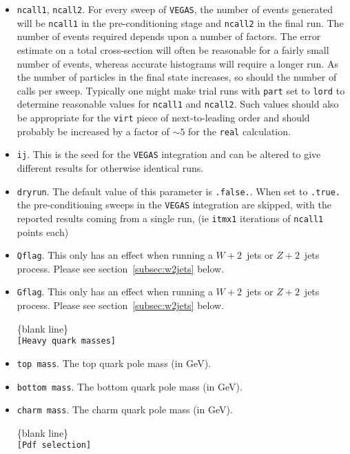 \documentclass[12pt]{article}
\begin{document}
\begin{itemize}
\item {\tt ncall1}, {\tt ncall2}. For every sweep of {\tt VEGAS},
the number of events generated will be {\tt ncall1} in the
pre-conditioning stage and {\tt ncall2} in the final run. The number
of events required depends upon a number of factors. The error
estimate on a total cross-section will often be reasonable for a
fairly small number of events, whereas accurate histograms will
require a longer run. As the number of particles in the final state
increases, so should the number of calls per sweep. Typically one
might make trial runs with {\tt part} set to {\tt lord} to determine
reasonable values for {\tt ncall1} and {\tt ncall2}. Such values
should also be appropriate for the {\tt virt} piece of
next-to-leading order and should probably be increased by a factor of
$\sim 5$ for the {\tt real} calculation.

\item {\tt ij}. This is the seed for the {\tt VEGAS} integration
and can be altered to give different results for otherwise identical
runs.

\item {\tt dryrun}. The default value of this parameter is
{\tt .false.}. When set to {\tt .true.} the pre-conditioning sweeps
in the {\tt VEGAS} integration are skipped, with the reported
results coming from a single run, (ie {\tt itmx1} iterations of 
{\tt ncall1} points each)
\item {\tt Qflag}. This only has an effect when running a
$W+2$~jets or $Z+2$~jets process. Please see section~\ref{subsec:w2jets}
below.

\item {\tt Gflag}. This only has an effect when running a
$W+2$~jets or $Z+2$~jets process. Please see section~\ref{subsec:w2jets}
below.

\begin{center}
\{blank line\} \\
{\tt [Heavy quark masses] }
\end{center}
\item {\tt top mass}. The top quark pole mass (in GeV).
\item {\tt bottom mass}. The bottom quark pole mass (in GeV).
\item {\tt charm mass}. The charm quark pole mass (in GeV).

\begin{center}
\{blank line\} \\
{\tt [Pdf selection] }
\end{center}


\end{itemize}
\end{document}
